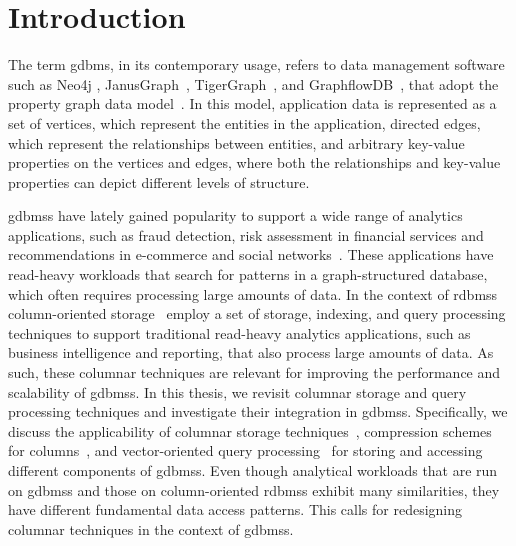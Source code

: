 
\chapter{Introduction}
\label{introduction}

The term \gls{gdbms}, in its contemporary usage, refers to data management software such as Neo4j \cite{neo4j}, JanusGraph~\cite{janusgraph}, TigerGraph~\cite{tigergraph}, and GraphflowDB~\cite{kankanamge:graphflow, mhedhbi:sqs}, that adopt the property graph data model~\cite{neo4j-property-graph-model}. In this model, application data is represented as a set of vertices, which represent the entities in the application, directed edges, which represent the relationships between entities, and arbitrary key-value properties on the vertices and edges, where both the relationships and key-value properties can depict different levels of structure.

\gls{gdbms}s have lately gained popularity to support a wide range of analytics applications, such as fraud detection, risk assessment in financial services and recommendations in e-commerce and social networks~\cite{sahu:survey}. These applications have read-heavy workloads that search for patterns in a graph-structured database, which often requires processing large amounts of data. In the context of \gls{rdbms}s column-oriented storage~\cite{monet-2decades, oracle-col, c-store, boncz-vectorwise} employ a set of storage, indexing, and query processing techniques to support traditional read-heavy analytics applications, such as business intelligence and reporting, that also process large amounts of data. As such, these columnar techniques are relevant for improving the performance and scalability of \gls{gdbms}s. In this thesis, we revisit columnar storage and query processing techniques and investigate their integration in \gls{gdbms}s. Specifically, we discuss the applicability of columnar storage techniques~\cite{c-store}, compression schemes for columns~\cite{abadi-col-comp, abadi-sparse-col, boncz-comp}, and vector-oriented query processing~\cite{boncz-monet-vectorized, col-vs-row} for storing and accessing different components of \gls{gdbms}s. Even though analytical workloads that are run on \gls{gdbms}s and those on column-oriented \gls{rdbms}s exhibit many similarities, they have different fundamental data access patterns. This calls for redesigning columnar techniques in the context of \gls{gdbms}s.

